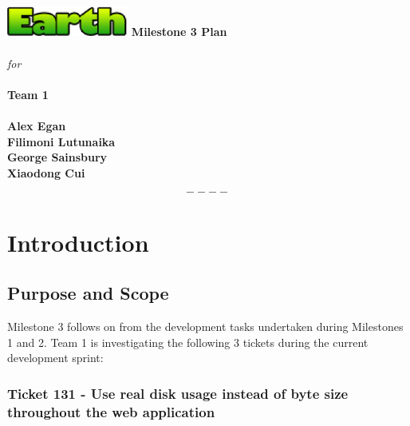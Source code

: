 \documentclass[10pt,a4,oneside]{article}
\begin{document}
\begin{titlepage}
\begin{center}
\includegraphics[width=40mm]{figs/earth}
\vfill
\textbf{\huge Milestone 3 Plan}\\ \textit{} \\ \textit{} 
\textit{for} \\ \textit{} \\ \textit{} 
\textbf{\huge Team 1}\\ \textit{} \\ \textit{}
\vfill
\textbf{Alex Egan \\ Filimoni Lutunaika \\ George Sainsbury \\ Xiaodong Cui}
\end{center}
\end{titlepage}
 


\newpage

\tableofcontents

\[----\]

\paragraph{}

\listoffigures
 
\newpage

\section{Introduction} 
 
\subsection{Purpose and Scope}

\label{subsec:purpose-and-scope}
 
Milestone 3 follows on from the development tasks undertaken during Milestones 1 and 2.
Team 1 is investigating the following 3 tickets during the current development sprint:

\subsubsection*{Ticket 131 - Use real disk usage instead of byte size throughout the web application}
\end{document}
